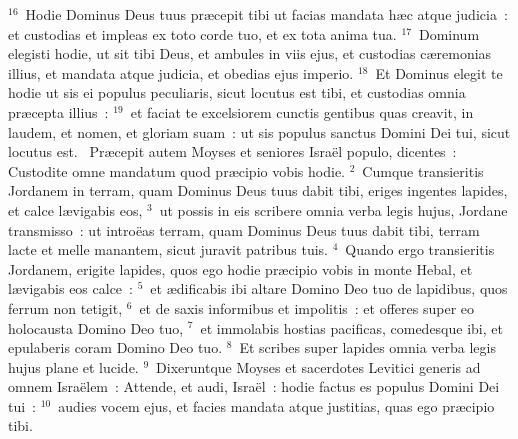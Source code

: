 ${}^{16}$~Hodie Dominus Deus tuus pr\ae cepit tibi ut facias mandata h\ae c atque judicia~: et custodias et impleas ex toto corde tuo, et ex tota anima tua.
${}^{17}$~Dominum elegisti hodie, ut sit tibi Deus, et ambules in viis ejus, et custodias c\ae remonias illius, et mandata atque judicia, et obedias ejus imperio.
${}^{18}$~Et Dominus elegit te hodie ut sis ei populus peculiaris, sicut locutus est tibi, et custodias omnia pr\ae cepta illius~:
${}^{19}$~et faciat te excelsiorem cunctis gentibus quas creavit, in laudem, et nomen, et gloriam suam~: ut sis populus sanctus Domini Dei tui, sicut locutus est.
~\lettrine[lines=10,image=true,loversize=0.05,lraise=-0.03]{P}{}r\ae cepit autem Moyses et seniores Isra\"el populo, dicentes~: Custodite omne mandatum quod pr\ae cipio vobis hodie.
${}^{2}$~Cumque transieritis Jordanem in terram, quam Dominus Deus tuus dabit tibi, eriges ingentes lapides, et calce l\ae vigabis eos,
${}^{3}$~ut possis in eis scribere omnia verba legis hujus, Jordane transmisso~: ut intro\"eas terram, quam Dominus Deus tuus dabit tibi, terram lacte et melle manantem, sicut juravit patribus tuis.
${}^{4}$~Quando ergo transieritis Jordanem, erigite lapides, quos ego hodie pr\ae cipio vobis in monte Hebal, et l\ae vigabis eos calce~:
${}^{5}$~et \ae dificabis ibi altare Domino Deo tuo de lapidibus, quos ferrum non tetigit,
${}^{6}$~et de saxis informibus et impolitis~: et offeres super eo holocausta Domino Deo tuo,
${}^{7}$~et immolabis hostias pacificas, comedesque ibi, et epulaberis coram Domino Deo tuo.
${}^{8}$~Et scribes super lapides omnia verba legis hujus plane et lucide.
${}^{9}$~Dixeruntque Moyses et sacerdotes Levitici generis ad omnem Isra\"elem~: Attende, et audi, Isra\"el~: hodie factus es populus Domini Dei tui~:
${}^{10}$~audies vocem ejus, et facies mandata atque justitias, quas ego pr\ae cipio tibi.


